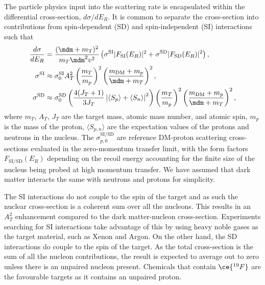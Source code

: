 The particle physics input into the scattering rate is encapsulated within the differential cross-section, $d\sigma/dE_R$. It is common to separate the cross-section into contributions from spin-dependent (SD) and spin-independent (SI) interactions such that
\begin{align}
    \frac{d\sigma}{dE_R} & = \frac{(\mdm + m_\mathrm{T})^2}{ m_T \mdm^2 v^2}\left(\sigma^\mathrm{SI}|F_\mathrm{SI}(E_R)|^2 + \sigma^\mathrm{SD}|F_\mathrm{SD}(E_R)|^2\right),\\
    \sigma^\mathrm{SI} & \approx   \sigma^\mathrm{SI}_{0}A_T^2\left(\frac{m_T}{m_p}\right)^2 \left( \frac{m_\mathrm{DM} + m_p}{\mdm + m_T}\right)^2,\\
    \sigma^\mathrm{SD} & \approx \sigma^\mathrm{SD}_{0}\left( \frac{4(J_T + 1)}{3 J_T}\left| \langle S_p\rangle + \langle S_n\rangle \right|^2 \right) \left(\frac{m_T}{m_p}\right)^2 \left( \frac{m_\mathrm{DM} + m_p}{\mdm + m_T}\right)^2,
\end{align}
where $m_T$, $A_T$, $J_T$ are the target mass, atomic mass number, and atomic spin, $m_p$ is the mass of the proton, $\langle S_{p,n}\rangle$ are the expectation values of the protons and neutrons in the nucleus. The $\sigma^{\mathrm{SI/SD}}_{p,0}$ are reference DM-proton scattering cross-sections evaluated in the zero-momentum transfer limit, with the form factors $F_{\mathrm{SI/SD}}(E_R)$ depending on the recoil energy accounting for the finite size of the nucleus being probed at high momentum transfer.
We have assumed that dark matter interacts the same with neutrons and protons for simplicity. 

The SI interactions do not couple to the spin of the target and as such the nuclear cross-section is a coherent sum over all the nucleons. This results in an $A_T^2$ enhancement compared to the dark matter-nucleon cross-section. Experiments searching for SI interactions take advantage of this by using heavy noble gases as the target material, such as Xenon and Argon. On the other hand, the SD interactions do couple to the spin of the target. As the total cross-section is the sum of all the nucleon contributions, the result is expected to average out to zero unless there is an unpaired nucleon present. Chemicals that contain $\ce{^{19}F}$ are the favourable targets as it contains an unpaired proton.


